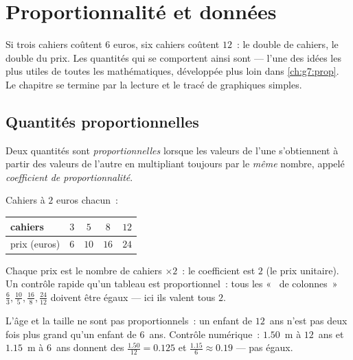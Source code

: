 \chapter{Proportionnalité et données}\label{ch:g6:propdata}

Si trois cahiers coûtent $6$ euros, six cahiers coûtent $12$~: le
double de cahiers, le double du prix. Les quantités qui se comportent
ainsi sont \emph{} --- l'une des idées les plus utiles
de toutes les mathématiques, développée plus loin dans
\cref{ch:g7:prop}. Le chapitre se termine par la lecture et le tracé
de graphiques simples.

\section{Quantités proportionnelles}

\begin{definition}[Proportionnalité]\label{def:g6:propdata:def}
Deux quantités sont \emph{proportionnelles}
lorsque les valeurs de l'une s'obtiennent à partir des valeurs de
l'autre en multipliant toujours par le \emph{même} nombre, appelé
\emph{coefficient de proportionnalité}.
\end{definition}

\begin{example}\label{ex:g6:propdata:table}
Cahiers à $2$ euros chacun~:
\begin{center}
\renewcommand{\arraystretch}{1.3}
\begin{tabular}{l|cccc}
cahiers & $3$ & $5$ & $8$ & $12$ \\
\hline
prix (euros) & $6$ & $10$ & $16$ & $24$ \\
\end{tabular}
\end{center}
Chaque prix est le nombre de cahiers $\times 2$~: le coefficient est
$2$ (le prix unitaire). Un contrôle rapide qu'un tableau est
proportionnel~: tous les «~ de colonnes~»
$\frac{6}{3}, \frac{10}{5}, \frac{16}{8}, \frac{24}{12}$ doivent être
égaux --- ici ils valent tous $2$.
\end{example}

\begin{example}\label{ex:g6:propdata:nonexample}
L'âge et la taille ne sont pas proportionnels~: un enfant de
$12$~ans n'est pas deux fois plus grand qu'un enfant de $6$~ans.
Contrôle numérique~: $1.50$~m à $12$~ans et $1.15$~m à $6$~ans
donnent des  $\frac{1.50}{12} = 0.125$ et
$\frac{1.15}{6} \approx 0.19$ --- pas égaux.
\end{example}

